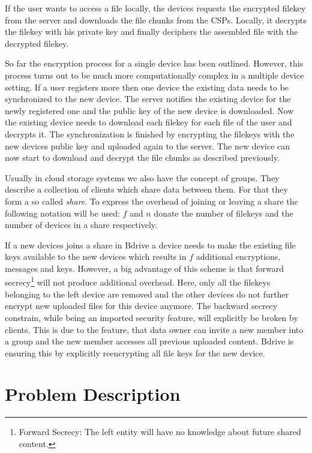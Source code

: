 If the user wants to access a file locally, the devices requests the encrypted filekey from the server and downloads the file chunks from the \ac{CSP}s. Locally, it decrypts the filekey with his private key and finally deciphers the assembled file with the decrypted filekey. 

So far the encryption process for a single device has been outlined. However, this process turns out to be much more computationally complex in a multiple device setting.  If a user registers more then one device the existing data needs to be synchronized to the new device. The server notifies the existing device for the newly registered one and the public key of the new device is downloaded. Now the existing device needs to download each filekey for each file of the user and decrypts it. The synchronization is finished by encrypting the filekeys with the new devices public key and uploaded again to the server. The new device can now start to download and decrypt the file chunks as described previously.

Usually in cloud storage systems we also have the concept of groups. They describe a collection of clients which share data between them. For that they form a so called \textit{share}. To express the overhead of joining or leaving a share the following notation will be used: $f$ and $n$ donate the number of filekeys and the number of devices in a share respectively.

If a new devices joins a share in Bdrive a device needs to make the existing file keys available to the new devices which results in $f$ additional encryptions, messages and keys. However, a big advantage of this scheme is that forward secrecy\footnote{Forward Secrecy: The left entity will have no knowledge about future shared content.} will not produce additional overhead. Here, only all the filekeys belonging to the left device are removed and the other devices do not further encrypt new uploaded files for this device anymore. The backward secrecy constrain, while being an imported security feature, will explicitly be broken by clients. This is due to the feature, that data owner can invite a new member into a group and the new member accesses all previous uploaded content. Bdrive is ensuring this by explicitly reencrypting all file keys for the new device. 

\section{Problem Description}

